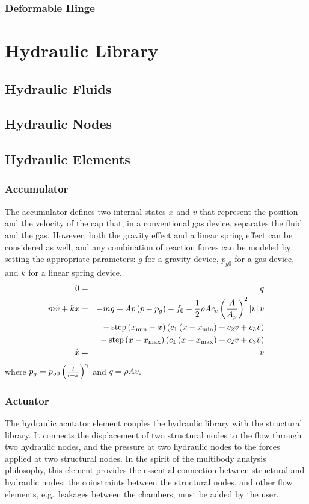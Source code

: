 \documentclass[10pt,dvips]{report}
\begin{document}
\subsection{Deformable Hinge}


\chapter{Hydraulic Library}
\section{Hydraulic Fluids}
\section{Hydraulic Nodes}

\section{Hydraulic Elements}

\subsection{Accumulator}
The accumulator defines two internal states $x$ and $v$ that represent 
the position and the velocity of the cap that, in a conventional
gas device, separates the fluid and the gas.
However, both the gravity effect and a linear spring effect
can be considered as well, and any combination of reaction forces
can be modeled by setting the appropriate parameters:
$g$ for a gravity device, $p_{g0}$ for a gas device, 
and $k$ for a linear spring device.
\begin{eqnarray*}
	0 & = & q \\
	m \dot{v} + k x & = & 
		- m g
		+ A p \left( p - p_g \right)
		- f_0 
		- \frac{1}{2} \rho A c_e \left( \frac{A}{A_p} \right)^2 \left| v \right| v \\
	& & \mbox{} - \mathrm{step}\left( x_{\mathrm{min}} - x \right)
		\left( c_1 \left( x - x_{\mathrm{min}} \right) + c_2 v + c_3 \dot{v} \right) \\
	& & \mbox{} - \mathrm{step}\left( x - x_{\mathrm{max}} \right)
		\left( c_1 \left( x - x_{\mathrm{max}} \right) + c_2 v + c_3 \dot{v} \right) \\
	\dot{x} & = & v
\end{eqnarray*}
where $p_g=p_{g0}\left( \frac{l}{l - x} \right)^{\gamma}$ and $q=\rho A v$.

\subsection{Actuator}
The hydraulic acutator element couples the hydraulic library 
with the structural library.
It connects the displacement of two structural nodes to the flow
through two hydraulic nodes, and the pressure at two hydraulic nodes
to the forces applied at two structural nodes.
In the spirit of the multibody analysis philosophy, this element
provides the essential connection between structural 
and hydraulic nodes; the coinstraints between the structural nodes, 
and other flow elements, e.g.\ leakages between the chambers, 
must be added by the user.
\end{document}
